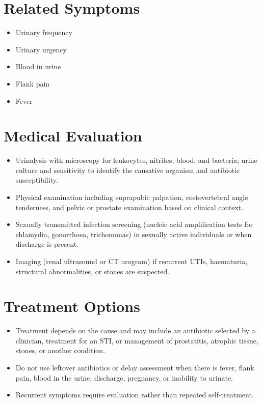 \section*{Related Symptoms}
\begin{itemize}
  \item Urinary frequency
  \item Urinary urgency
  \item Blood in urine
  \item Flank pain
  \item Fever
\end{itemize}


\section*{Medical Evaluation}
\begin{itemize}
  \item Urinalysis with microscopy for leukocytes, nitrites, blood, and bacteria; urine culture and sensitivity to identify the causative organism and antibiotic susceptibility.
  \item Physical examination including suprapubic palpation, costovertebral angle tenderness, and pelvic or prostate examination based on clinical context.
  \item Sexually transmitted infection screening (nucleic acid amplification tests for chlamydia, gonorrhoea, trichomonas) in sexually active individuals or when discharge is present.
  \item Imaging (renal ultrasound or CT urogram) if recurrent UTIs, haematuria, structural abnormalities, or stones are suspected.
\end{itemize}

\section*{Treatment Options}
\begin{itemize}
  \item Treatment depends on the cause and may include an antibiotic selected by a clinician, treatment for an STI, or management of prostatitis, atrophic tissue, stones, or another condition.
  \item Do not use leftover antibiotics or delay assessment when there is fever, flank pain, blood in the urine, discharge, pregnancy, or inability to urinate.
  \item Recurrent symptoms require evaluation rather than repeated self-treatment.
\end{itemize}

